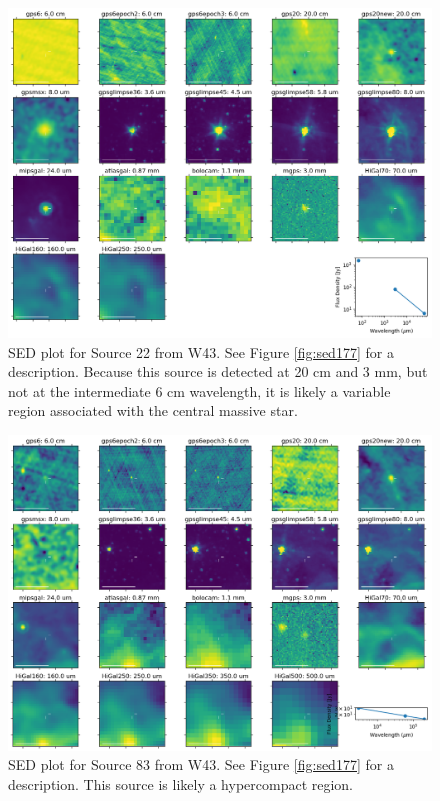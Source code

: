 \documentclass[twocolumn]{aastex62}
\begin{document}
\begin{figure}[htp]
    \includegraphics[width=17cm]{figures/SED_plot_G031_22.png}
\caption{SED plot for Source 22 from W43.  See Figure \ref{fig:sed177} for a description.
Because this source is detected at 20 cm and 3 mm, but not at the intermediate 6 cm wavelength,
it is likely a variable \hii region associated with the central massive star.
}
\label{fig:sed22}
\end{figure}


\begin{figure}[htp]
    \includegraphics[width=17cm]{figures/SED_plot_G031_83.png}
    \caption{SED plot for Source 83 from W43.  See Figure \ref{fig:sed177} for a description.
    This source is likely a hypercompact \hii region.}
\label{fig:sed83}
\end{figure}


\end{document}
